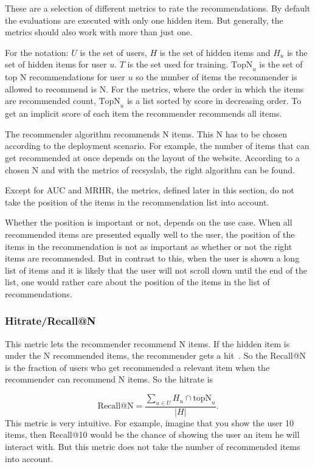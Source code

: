 These are a selection of different metrics to rate the recommendations.
By default the evaluations are executed with only one hidden item.
But generally, the metrics should also work with more than just one.

For the notation: $U$ is the set of users, $H$ is the set of hidden items
and \(H_u\) is the set of hidden items for user $u$. $T$ is the set used for 
training. \(\text{TopN}_u\)
is the set of top N recommendations for user $u$ so the number of items
the recommender is allowed to recommend is N. For the metrics, where
the order in which the items are recommended count, \(\text{TopN}_u\)
is a list sorted by score in decreasing order.
To get an implicit score of each item the recommender recommends all
items.

The recommender algorithm recommends N items. This N has to be chosen
according to the deployment scenario. For example, the number of items that can get recommended at once depends on the layout of the website.
According to a chosen N and with the metrics of recsyslab, the right
algorithm can be found. 

Except for AUC and MRHR, the metrics, defined later in this section, do not take the position
of the items in the recommendation list into account.

Whether the position is important or not, depends on the use case.
When all recommended items are presented equally well to the
user, the position of the items in the recommendation
is not as important as whether or not the right items are
recommended. But in contrast to this, when the user is shown 
a long list of items and it is likely that the user will not
scroll down until the end of the list, one would rather care about
the position of the items in the list of recommendations.

\subsubsection{Hitrate/Recall@N}

This metric lets the recommender recommend N items. If the hidden
item is under the N recommended items, the recommender gets a 
hit~\cite{Karypis:2001:EIT:502585.502627, Sarwar00applicationof}.
So the Recall@N is the fraction of users who get recommended a
relevant item when the recommender can recommend N items.
So the hitrate is 

\begin{equation} 
\text{Recall@N}=\frac{\sum_{u \in U} H_u \cap \text{topN}_u}{|H|}.
\end{equation}
This metric is very intuitive. For example, imagine that you
show the user 10 items, then Recall@10 would be the chance of showing
the user an item he will interact with. But this metric does not take
the number of recommended items into account.


